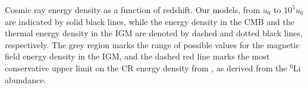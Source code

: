 \label{fig:ucr}
Cosmic ray energy density as a function of redshift.  Our models, from $u_0$ to $10^5u_0$ are indicated by solid black lines, while the energy density in the CMB and the thermal energy density in the IGM are denoted by dashed and dotted black lines, respectively. The grey region marks the range of possible values for the magnetic field energy density in the IGM, and the dashed red line marks the most conservative upper limit on the CR energy density from \citep{RollindeVangioniOlive2006}, as derived from the $^6$Li abundance.